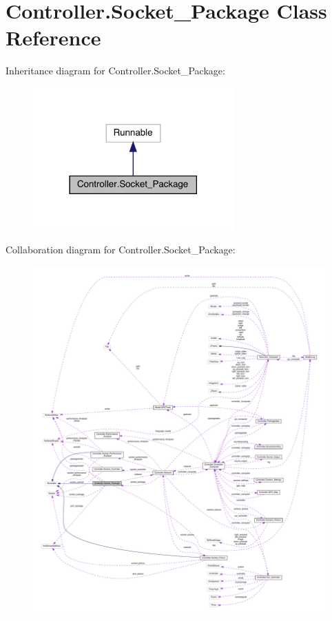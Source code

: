 \hypertarget{class_controller_1_1_socket___package}{}\section{Controller.\+Socket\+\_\+\+Package Class Reference}
\label{class_controller_1_1_socket___package}


Inheritance diagram for Controller.\+Socket\+\_\+\+Package\+:
\nopagebreak
\begin{figure}[H]
\begin{center}
\leavevmode
\includegraphics[width=218pt]{class_controller_1_1_socket___package__inherit__graph}
\end{center}
\end{figure}


Collaboration diagram for Controller.\+Socket\+\_\+\+Package\+:
\nopagebreak
\begin{figure}[H]
\begin{center}
\leavevmode
\includegraphics[width=350pt]{class_controller_1_1_socket___package__coll__graph}
\end{center}
\end{figure}

